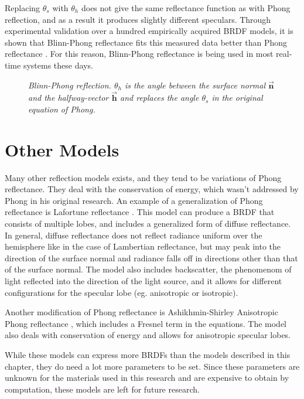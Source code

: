 Replacing $\theta_s$ with $\theta_h$ does not give the same reflectance function as with Phong reflection, and as a result it produces slightly different speculars. Through experimental validation over a hundred empirically acquired BRDF models, it is shown that Blinn-Phong reflectance fits this measured data better than Phong reflectance \cite{ExperimentalValidation}. For this reason, Blinn-Phong reflectance is being used in most real-time systems these days.

\begin{figure}[H]
	\begin{center}
	\end{center}
	\caption{{\it Blinn-Phong reflection. $\theta_h$ is the angle between the surface normal $\vec{\mathbf{n}}$ and the halfway-vector $\vec{\mathbf{h}}$ and replaces the angle $\theta_s$ in the original equation of Phong.}}
	\label{fig:BLINNPHONG}
\end{figure}


	\section{Other Models}\label{sec:Other}
		Many other reflection models exists, and they tend to be variations of Phong reflectance. They deal with the conservation of energy, which wasn't addressed by Phong in his original research. An example of a generalization of Phong reflectance is Lafortune reflectance \cite{Lafortune}. This model can produce a BRDF that consists of multiple lobes, and includes a generalized form of diffuse reflectance. In general, diffuse reflectance does not reflect radiance uniform over the hemisphere like in the case of Lambertian reflectance, but may peak into the direction of the surface normal and radiance falls off in directions other than that of the surface normal. The model also includes backscatter, the phenomenom of light reflected into the direction of the light source, and it allows for different configurations for the specular lobe (eg. anisotropic or isotropic).

Another modification of Phong reflectance is Ashikhmin-Shirley Anisotropic Phong reflectance \cite{AshikhminShirley}, which includes a Fresnel term in the equations. The model also deals with conservation of energy and allows for anisotropic specular lobes.

While these models can express more BRDFs than the models described in this chapter, they do need a lot more parameters to be set. Since these parameters are unknown for the materials used in this research and are expensive to obtain by computation, these models are left for future research.

